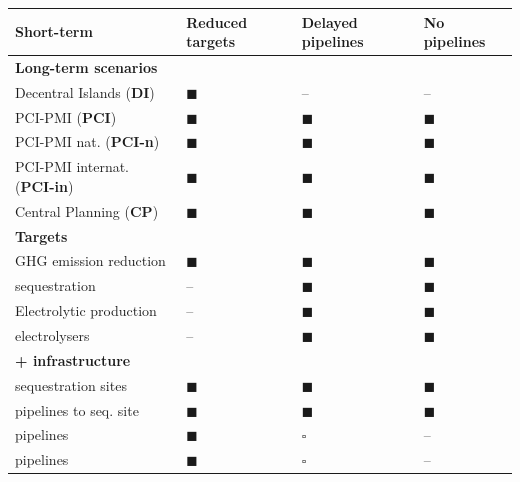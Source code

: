 \documentclass[a0,portrait]{a0poster}
\begin{document}
\begin{multicols}{3}
\begin{center}
    \label{fig:regret_matrix_setup}
    \scriptsize
    \begin{tabularx}{\linewidth}{R{7.5cm}>{\centering\arraybackslash}X>{\centering\arraybackslash}X>{\centering\arraybackslash}X}
        \toprule
        \textbf{Short-term} & \textbf{Reduced targets} & \textbf{Delayed pipelines} & \textbf{No pipelines} \\
        \midrule
        \textbf{Long-term scenarios} & & & \\
        Decentral Islands (\textbf{DI}) & $\blacksquare$ & -- & -- \\
        PCI-PMI (\textbf{PCI}) & $\blacksquare$ & $\blacksquare$ & $\blacksquare$ \\
        PCI-PMI nat. (\textbf{PCI-n}) & $\blacksquare$ & $\blacksquare$ & $\blacksquare$\\
        PCI-PMI internat. (\textbf{PCI-in}) & $\blacksquare$ & $\blacksquare$ & $\blacksquare$ \\
        Central Planning (\textbf{CP}) & $\blacksquare$ & $\blacksquare$ & $\blacksquare$ \\
        \midrule
        \textbf{Targets} & & & \\
        GHG emission reduction &  $\blacksquare$ &  $\blacksquare$ &  $\blacksquare$ \\
         sequestration &  -- &  $\blacksquare$ &  $\blacksquare$ \\
        Electrolytic  production &  -- &  $\blacksquare$ &  $\blacksquare$ \\
         electrolysers &  -- &  $\blacksquare$ &  $\blacksquare$ \\
        \midrule
        \textbf{ +  infrastructure} & & & \\
         sequestration sites & $\blacksquare$ &  $\blacksquare$ &  $\blacksquare$ \\
         pipelines to seq. site & $\blacksquare$ &  $\blacksquare$ &  $\blacksquare$ \\
         pipelines & $\blacksquare$ &  $\square$ &  -- \\
         pipelines & $\blacksquare$ &  $\square$ &  -- \\
        \bottomrule
    \end{tabularx}
\end{center}


\end{multicols}
\end{document}
